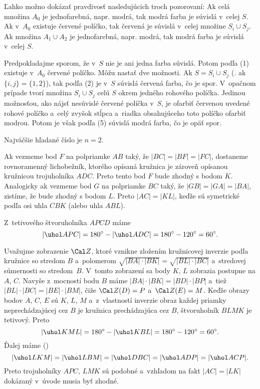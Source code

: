 {Ľahko možno dokázať pravdivosť nasledujúcich troch pozorovaní:
Ak celá množina $A_0$ je jednofarebná, napr. modrá, tak modrá farba je súvislá v~celej $S$.
Ak v~$A_0$ existuje červené políčko, tak červená je súvislá v~celej množine $S_i\cup S_j$.
Ak množina $A_1\cup A_2$ je jednofarebná, napr. modrá, tak modrá farba je súvislá v~celej $S$.

Predpokladajme sporom, že v~$S$ nie je ani jedna farba súvislá. Potom podľa (1) existuje v~$A_0$ červené políčko. Môžu nastať dve možnosti. Ak $S=S_i\cup S_j$ (\tj. ak $\{i,j\}=\{1,2\}$), tak podľa (2) je v~$S$ súvislá červená farba, čo je spor. V~opačnom prípade tvorí množina $S_i\cup S_j$ celú $S$ okrem jedného rohového políčka. Jedinou možnosťou, ako nájsť nesúvislé červené políčka v~$S$, je ofarbiť červenou uvedené rohové políčko a~celý zvyšok stĺpca a~riadka obsahujúceho toto políčko ofarbiť modrou. Potom je však podľa (5) súvislá modrá farba, čo je opäť spor.

\odpoved
Najväčšie hľadané číslo je $n=2$.
}

{%
Ak vezmeme bod $F$ na polpriamke $AB$ taký, že $|BC| = |BF| = |FC|$, dostaneme rovnoramenný lichobežník,
ktorého opísaná kružnica je zároveň opísanou kružnicou trojuholníka $ADC$.
Preto tento bod $F$ bude zhodný s bodom $K$.
Analogicky ak vezmeme bod $G$ na polpriamke $BC$ taký, že $|GB| = |GA| = |BA|$,
zistíme, že bude zhodný s bodom $L$.
Preto $|AC| = |KL|$, keďže sú symetrické podľa osi uhla $CBK$ (alebo uhla $ABL$).
%

Z~tetivového štvoruholníka $APCD$ máme
$$
|\uhol APC| = 180^\circ - |\uhol ADC| = 180^\circ - 120^\circ = 60^\circ.
$$

Uvažujme zobrazenie $\Cal Z$, ktoré vznikne zložením kružnicovej inverzie podľa kružnice so stredom $B$ a~polomerom $\sqrt{|BA|\cdot|BK|}=\sqrt{|BL|\cdot|BC|}$ a~stredovej súmernosti so stredom~$B$. V~tomto zobrazení sa body $K$, $L$ zobrazia postupne na $A$, $C$. Navyše z~mocností bodu $B$ máme $|BA|\cdot|BK|=|BD|\cdot|BP|$ a~tiež $|BL|\cdot|BC|=|BE|\cdot|BM|$, čiže ${\Cal Z}(D)=P$ a~${\Cal Z}(E)=M$.
Keďže obrazy bodov $A$, $C$, $E$ sú $K$, $L$, $M$ a~z~vlastností inverzie obraz každej priamky neprechádzajúcej cez $B$ je kružnica prechádzajúca cez $B$, štvoruholník $BLMK$ je tetivový. Preto
$$
|\uhol KML| = 180^\circ - |\uhol KBL| = 180^\circ - 120^\circ = 60^\circ.
$$
Ďalej máme (\obr)
$$
|\uhol LKM| =|\uhol LBM| =|\uhol DBC| = |\uhol ADP| = |\uhol ACP|.
$$
Preto trojuholníky $APC$, $LMK$ sú podobné a~vzhľadom na fakt $|AC| = |LK|$ dokázaný v~úvode musia byť zhodné.
}

